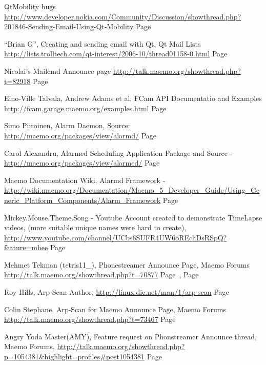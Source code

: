 \documentclass[11pt]{article} %
\begin{document}
\begin{thebibliography}{9}
QtMobility bugs
\url{http://www.developer.nokia.com/Community/Discussion/showthread.php?201846-Sending-Email-Using-Qt-Mobility}
Page~\pageref{ref:qtmobbug}

“Brian G”, Creating and sending email with Qt, Qt Mail Lists
\url{http://lists.trolltech.com/qt-interest/2006-10/thread01158-0.html}
Page~\pageref{ref:qtcp}

Nicolai’s Mailcmd Announce page
\url{http://talk.maemo.org/showthread.php?t=82918}
Page~\pageref{ref:mailcmd}

Eino-Ville Talvala, Andrew Adams et al, FCam API Documentatio and Examples
\url{http://fcam.garage.maemo.org/examples.html}
Page~\pageref{ref:fcamapi}

Simo Piiroinen, Alarm Daemon,  Source: \url{http://maemo.org/packages/view/alarmd/}
Page~\pageref{ref:alarmdpack}

Carol Alexandru, Alarmed Scheduling Application Package and Source - \url{http://maemo.org/packages/view/alarmed/}
Page~\pageref{ref:alarmedpyth}

Maemo Documentation Wiki, Alarmd Framework - \url{http://wiki.maemo.org/Documentation/Maemo_5_Developer_Guide/Using_Generic_Platform_Components/Alarm_Framework}
Page~\pageref{ref:alarmdframe}

Mickey.Mouse.Theme.Song - Youtube Account created to demonstrate TimeLapse videos, (more suitable unique names were hard to create), \url{http://www.youtube.com/channel/UCbs6SUFR4UW6oREchDsRSpQ?feature=mhee}
Page~\pageref{ref:mickey}

Mehmet Tekman (tetris11\_), Phonestreamer Announce Page, Maemo Forums
\url{http://talk.maemo.org/showthread.php?t=70877}
Page~\pageref{ref:phonstreamer}, Page~\pageref{ref:phonser}

Roy Hills, Arp-Scan Author, \url{http://linux.die.net/man/1/arp-scan}
Page~\pageref{ref:arpscanman}

Colin Stephane, Arp-Scan for Maemo Announce Page, Maemo Forums
\url{http://talk.maemo.org/showthread.php?t=73467}
Page~\pageref{ref:arpscanmaemo}

Angry Yoda Master(AMY), Feature request on Phonstreamer Announce thread, Maemo Forums,
\url{http://talk.maemo.org/showthread.php?p=1054381\&highlight=profiles\#post1054381}
Page~\pageref{ref:amy}


\end{thebibliography}
\end{document}

